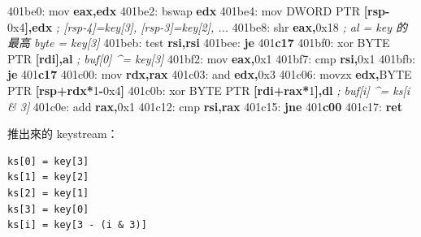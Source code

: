 \documentclass[10pt,a4paper]{article}
\newenvironment{Shaded}{\begin{snugshade}}{\end{snugshade}}
\newcommand{\BaseNTok}[1]{\textcolor[rgb]{0.00,0.00,0.81}{#1}}
\newcommand{\BuiltInTok}[1]{#1}
\newcommand{\CommentTok}[1]{\textcolor[rgb]{0.56,0.35,0.01}{\textit{#1}}}
\newcommand{\ControlFlowTok}[1]{\textcolor[rgb]{0.13,0.29,0.53}{\textbf{#1}}}
\newcommand{\DataTypeTok}[1]{\textcolor[rgb]{0.13,0.29,0.53}{#1}}
\newcommand{\DecValTok}[1]{\textcolor[rgb]{0.00,0.00,0.81}{#1}}
\newcommand{\ErrorTok}[1]{\textcolor[rgb]{0.64,0.00,0.00}{\textbf{#1}}}
\newcommand{\KeywordTok}[1]{\textcolor[rgb]{0.13,0.29,0.53}{\textbf{#1}}}
\newcommand{\NormalTok}[1]{#1}
\newcommand{\OperatorTok}[1]{\textcolor[rgb]{0.81,0.36,0.00}{\textbf{#1}}}
\renewenvironment{Shaded}{%
  \def\FrameCommand{\fboxsep=3.2pt\colorbox{shadecolor}}%
  \MakeFramed{\advance\hsize-\width\FrameRestore\small}%
}{%
  \endMakeFramed
}
\begin{document}
\begin{Shaded}
\begin{Highlighting}[]
\NormalTok{401be0:  }\BuiltInTok{mov}  \KeywordTok{eax}\OperatorTok{,}\KeywordTok{edx}
\NormalTok{401be2:  }\BuiltInTok{bswap} \KeywordTok{edx}
\NormalTok{401be4:  }\BuiltInTok{mov}  \DataTypeTok{DWORD} \DataTypeTok{PTR} \OperatorTok{[}\KeywordTok{rsp}\OperatorTok{{-}}\BaseNTok{0x4}\OperatorTok{],}\KeywordTok{edx}     \CommentTok{; [rsp{-}4]=key[3], [rsp{-}3]=key[2], ...}
\NormalTok{401be8:  }\BuiltInTok{shr}  \KeywordTok{eax}\OperatorTok{,}\BaseNTok{0x18}                    \CommentTok{; al = key 的最高 byte = key[3]}
\NormalTok{401beb:  }\BuiltInTok{test} \KeywordTok{rsi}\OperatorTok{,}\KeywordTok{rsi}
\NormalTok{401bee:  }\ControlFlowTok{je}   \DecValTok{401}\ErrorTok{c17}
\NormalTok{401bf0:  }\BuiltInTok{xor}  \DataTypeTok{BYTE} \DataTypeTok{PTR} \OperatorTok{[}\KeywordTok{rdi}\OperatorTok{],}\KeywordTok{al}           \CommentTok{; buf[0] \^{}= key[3]}
\NormalTok{401bf2:  }\BuiltInTok{mov}  \KeywordTok{eax}\OperatorTok{,}\BaseNTok{0x1}
\NormalTok{401bf7:  }\BuiltInTok{cmp}  \KeywordTok{rsi}\OperatorTok{,}\BaseNTok{0x1}
\NormalTok{401bfb:  }\ControlFlowTok{je}   \DecValTok{401}\ErrorTok{c17}
\NormalTok{401c00:  }\BuiltInTok{mov}  \KeywordTok{rdx}\OperatorTok{,}\KeywordTok{rax}
\NormalTok{401c03:  }\BuiltInTok{and}  \KeywordTok{edx}\OperatorTok{,}\BaseNTok{0x3}
\NormalTok{401c06:  }\BuiltInTok{movzx} \KeywordTok{edx}\OperatorTok{,}\DataTypeTok{BYTE} \DataTypeTok{PTR} \OperatorTok{[}\KeywordTok{rsp}\OperatorTok{+}\KeywordTok{rdx}\OperatorTok{*}\DecValTok{1}\OperatorTok{{-}}\BaseNTok{0x4}\OperatorTok{]}
\NormalTok{401c0b:  }\BuiltInTok{xor}  \DataTypeTok{BYTE} \DataTypeTok{PTR} \OperatorTok{[}\KeywordTok{rdi}\OperatorTok{+}\KeywordTok{rax}\OperatorTok{*}\DecValTok{1}\OperatorTok{],}\KeywordTok{dl}     \CommentTok{; buf[i] \^{}= ks[i \& 3]}
\NormalTok{401c0e:  }\BuiltInTok{add}  \KeywordTok{rax}\OperatorTok{,}\BaseNTok{0x1}
\NormalTok{401c12:  }\BuiltInTok{cmp}  \KeywordTok{rsi}\OperatorTok{,}\KeywordTok{rax}
\NormalTok{401c15:  }\ControlFlowTok{jne}  \DecValTok{401}\ErrorTok{c00}
\NormalTok{401c17:  }\ControlFlowTok{ret}
\end{Highlighting}
\end{Shaded}

推出來的 keystream：

\begin{Verbatim}[breaklines=true,breakanywhere=true,breakautoindent=false,fontsize=\fontsize{7.0}{9.5}\selectfont]
ks[0] = key[3]
ks[1] = key[2]
ks[2] = key[1]
ks[3] = key[0]
ks[i] = key[3 - (i & 3)]
\end{Verbatim}
\end{document}
